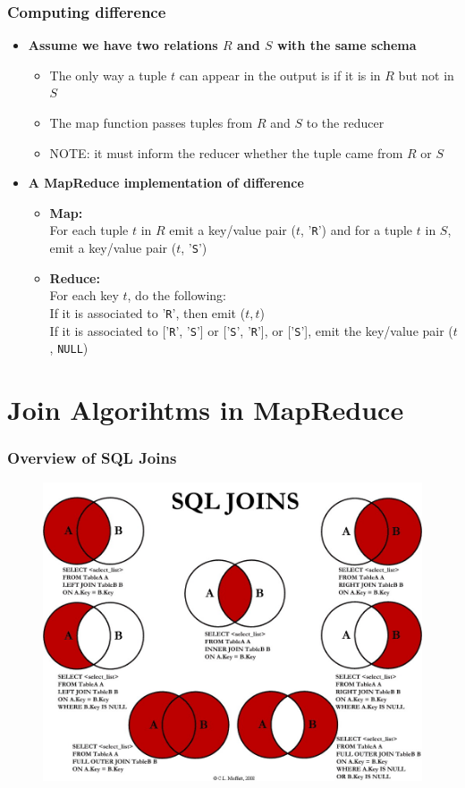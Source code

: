 \documentclass{beamer}
\newcommand{\bi}{\begin{itemize}}
\newcommand{\ei}{\end{itemize}}
\newcommand{\ii}{\item}
\newcommand*{\mygreen}[1]{\textcolor{mygreen}{#1}}
\begin{document}
\begin{frame}
\frametitle{Computing difference}
\bi
\ii \textbf{Assume we have two relations $R$ and $S$ with the same schema}
\bi
\ii The only way a tuple $t$ can appear in the output is if it is in $R$ but not in $S$
\ii The map function passes tuples from $R$ and $S$ to the reducer
\ii NOTE: it must inform the reducer whether the tuple came from $R$ or $S$
\ei
\ei

\bi
\ii \textbf{A MapReduce implementation of difference}
\bi
\ii \mygreen{\textbf{Map:}}\\
For each tuple $t$ in $R$ emit a key/value pair ($t$, '\texttt{R}') and for a tuple $t$ in $S$, emit a key/value pair ($t$, '\texttt{S}')
\ii \mygreen{\textbf{Reduce:}}\\
For each key $t$, do the following:\\
If it is associated to '\texttt{R}', then emit ($t, t$) \\
If it is associated to ['\texttt{R}', '\texttt{S}'] or ['\texttt{S}', '\texttt{R}'], or ['\texttt{S}'], emit the key/value pair ($t$, \texttt{NULL})
\ei
\ei

\end{frame}

\section{Join Algorihtms in MapReduce} 


\begin{frame}
\frametitle{Overview of SQL Joins}

\begin{figure}[h]
\centering\includegraphics[width=0.91\linewidth]{sql-joins.jpg}
\end{figure}

\end{frame}
\end{document}
